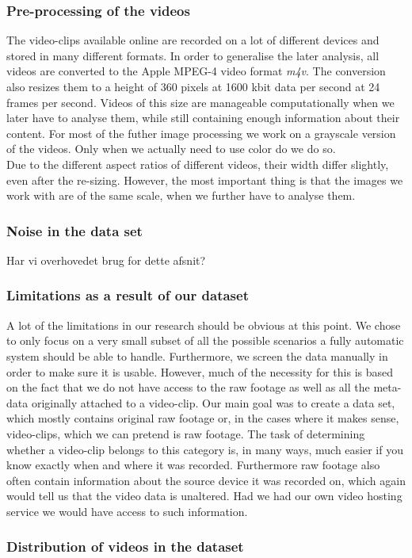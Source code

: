 \subsubsection{Pre-processing of the videos}
%
The video-clips available online are recorded on a lot of different devices and stored in many different formats. In order to generalise the later analysis, all videos are converted to the Apple MPEG-4 video format \textit{m4v}. The conversion also resizes them to a height of 360 pixels at 1600 kbit data per second at 24 frames per second. Videos of this size are manageable computationally when we later have to analyse them, while still containing enough information about their content. For most of the futher image processing we work on a grayscale version of the videos. Only when we actually need to use color do we do so.\\
Due to the different aspect ratios of different videos, their width differ slightly, even after the re-sizing. However, the most important thing is that the images we work with are of the same scale, when we further have to analyse them.
%
\subsubsection{Noise in the data set}
%
Har vi overhovedet brug for dette afsnit?
%
\subsubsection{Limitations as a result of our dataset}
%
%
A lot of the limitations in our research should be obvious at this point. We chose to only focus on a very small subset of all the possible scenarios a fully automatic system should be able to handle. Furthermore, we screen the data manually in order to make sure it is usable. However, much of the necessity for this is based on the fact that we do not have access to the raw footage as well as all the meta-data originally attached to a video-clip. Our main goal was to create a data set, which mostly contains original raw footage or, in the cases where it makes sense, video-clips, which we can pretend is raw footage. The task of determining whether a video-clip belongs to this category is, in many ways, much easier if you know exactly when and where it was recorded. Furthermore raw footage also often contain information about the source device it was recorded on, which again would tell us that the video data is unaltered. Had we had our own video hosting service we would have access to such information.
%
\subsubsection{Distribution of videos in the dataset}
%
